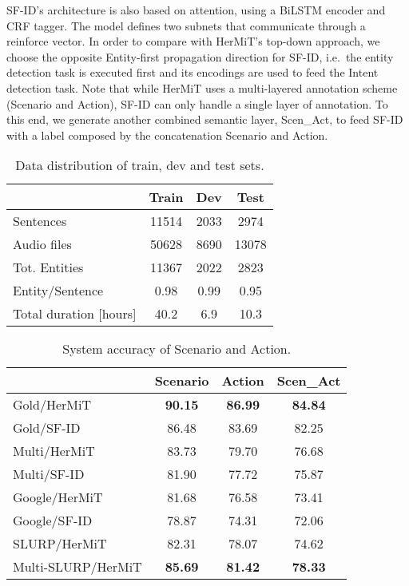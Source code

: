 \documentclass[11pt,a4paper]{article}
\newcommand{\hermit}{HerMiT}
\newcommand{\sfid}{SF-ID}
\begin{document}
\sfid's architecture is also based on attention, using a BiLSTM encoder and CRF tagger. The model defines two subnets that communicate through a reinforce vector. 
In order to compare with \hermit's top-down approach, we choose the opposite Entity-first propagation direction for \sfid, i.e.\ the entity detection task is executed first and its encodings are used to feed the Intent detection task.
Note that while \hermit{} uses a multi-layered annotation scheme (Scenario and Action), \sfid{} can only handle a single layer of annotation. To this end, we generate another combined semantic layer, Scen\_Act, to feed \sfid{} with a label composed by the concatenation Scenario and Action.



\begin{table}[t]
	\centering
	\footnotesize
	\begin{tabular}{l|ccc}
	\toprule
	& Train & Dev & Test\\
	\midrule
	Sentences & 11514 & 2033 & 2974 \\
    Audio files & 50628 & 8690 & 13078 \\
    Tot. Entities & 11367 & 2022 & 2823 \\
    Entity/Sentence & 0.98 & 0.99 & 0.95 \\
    Total duration [hours]  & 40.2 & 6.9 & 10.3 \\
    \bottomrule
	\end{tabular}
	\caption{Data distribution of train, dev and test sets.}
	\label{tab:split}
\end{table}




\begin{table}[t]
	\centering
	\footnotesize
	\begin{tabular}{l|ccc}
	\toprule
	& \textbf{Scenario} & \textbf{Action} & \textbf{Scen\_Act}\\
	\midrule
	Gold/\hermit & {\bf 90.15} & {\bf 86.99} & {\bf 84.84} \\
	Gold/\sfid & 86.48 & 83.69 & 82.25 \\
	\midrule
    Multi/\hermit & 83.73 & 79.70 & 76.68 \\
    Multi/\sfid & 81.90 & 77.72 & 75.87 \\
    Google/\hermit & 81.68 & 76.58 & 73.41\\
    Google/\sfid & 78.87 & 74.31 & 72.06\\
    \midrule SLURP/\hermit & 82.31 & 78.07 & 74.62 \\
    {\scriptsize Multi-SLURP/\hermit} & {\bf 85.69} & {\bf 81.42} & {\bf 78.33} \\
    \bottomrule
   	\end{tabular}
	\caption{System accuracy of Scenario and Action.}
	\label{tab:intents}
\end{table}
\end{document}
